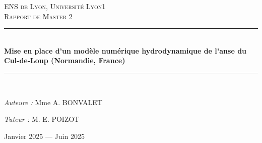 \documentclass[10pt,a4paper,titlepage]{article}
\newcommand{\HRule}{\rule{\linewidth}{0.5mm}}
\begin{document}
    \begin{titlepage}
        \begin{sffamily}
            \begin{center}


                \textsc{\LARGE ENS de Lyon, Université Lyon1}\\[2cm]

                \textsc{\Large Rapport de Master 2}\\[1.5cm]

                \HRule \\[0.4cm]
                { \huge \bfseries Mise en place d’un modèle numérique hydrodynamique de l’anse du Cul-de-Loup (Normandie, France)\\ [0.4cm] }

                \HRule \\[2cm]

                \begin{minipage}{0.4\textwidth}
                    \begin{flushleft} \large
                        \emph{Auteure :} Mme \textsc{A. BONVALET}\\
                    \end{flushleft}
                \end{minipage}
                \begin{minipage}{0.4\textwidth}
                    \begin{flushright} \large
                        \emph{Tuteur :} M. \textsc{E. POIZOT}\\
                    \end{flushright}
                \end{minipage}

                \vfill

                {\large Janvier 2025 — Juin 2025}

            \end{center}
        \end{sffamily}
    \end{titlepage}
\end{document}
